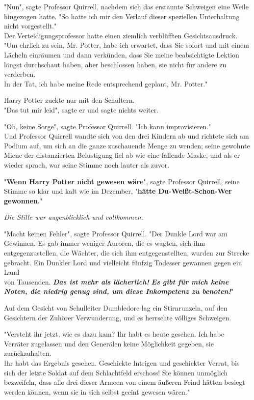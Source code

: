 {"Nun", sagte Professor Quirrell, nachdem sich das erstaunte Schweigen eine Weile hingezogen hatte. "So hatte ich mir den Verlauf dieser speziellen Unterhaltung nicht vorgestellt."\\ Der Verteidigungsprofessor hatte einen ziemlich verblüfften Gesichtsausdruck.\\ "Um ehrlich zu sein, Mr. Potter, habe ich erwartet, dass Sie sofort und mit einem Lächeln einräumen und dann verkünden, dass Sie meine beabsichtigte Lektion längst durchschaut haben, aber beschlossen haben, sie nicht für andere zu verderben.\\ In der Tat, ich habe meine Rede entsprechend geplant, Mr. Potter."

Harry Potter zuckte nur mit den Schultern.\\ "Das tut mir leid", sagte er und sagte nichts weiter.

"Oh, keine Sorge", sagte Professor Quirrell. "Ich kann improvisieren."\\ Und Professor Quirrell wandte sich von den drei Kindern ab und richtete sich am Podium auf, um sich an die ganze zuschauende Menge zu wenden; seine gewohnte Miene der distanzierten Belustigung fiel ab wie eine fallende Maske, und als er wieder sprach, war seine Stimme noch lauter als zuvor.

"\textbf{Wenn Harry Potter nicht gewesen wäre}", sagte Professor Quirrell, seine Stimme so klar und kalt wie im Dezember, "\textbf{hätte Du-Weißt-Schon-Wer gewonnen.}"

\emph{Die Stille war augenblicklich und vollkommen.}

"Macht keinen Fehler", sagte Professor Quirrell. "Der Dunkle Lord war am Gewinnen. Es gab immer weniger Auroren, die es wagten, sich ihm entgegenzustellen, die Wächter, die sich ihm entgegenstellten, wurden zur Strecke gebracht. Ein Dunkler Lord und vielleicht fünfzig Todesser gewannen gegen ein Land\\ von Tausenden. \textbf{\emph{Das ist mehr als lächerlich!}} \textbf{\emph{Es gibt für mich keine Noten, die niedrig genug sind, um diese Inkompetenz zu benoten!}}"

Auf dem Gesicht von Schulleiter Dumbledore lag ein Stirnrunzeln, auf den Gesichtern der Zuhörer Verwunderung, und es herrschte völliges Schweigen.

"Versteht ihr jetzt, wie es dazu kam? Ihr habt es heute gesehen. Ich habe Verräter zugelassen und den Generälen keine Möglichkeit gegeben, sie zurückzuhalten.\\ Ihr habt das Ergebnis gesehen. Geschickte Intrigen und geschickter Verrat, bis sich der letzte Soldat auf dem Schlachtfeld erschoss! Sie können unmöglich bezweifeln, dass alle drei dieser Armeen von einem äußeren Feind hätten besiegt werden können, wenn sie in sich selbst geeint gewesen wären."

}

